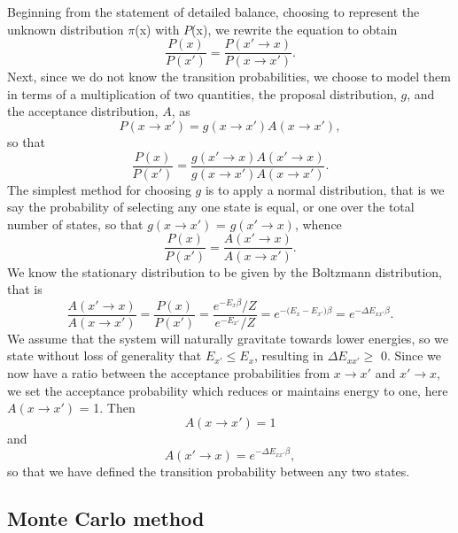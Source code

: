 \documentclass[11pt,a4paper]{article}
\begin{document}
Beginning from the statement of detailed balance, choosing to represent the unknown distribution $\pi$(x) with $P$(x), we rewrite the equation to obtain
\begin{equation}
\frac{P(x)}{P(x')} = \frac{P(x' \rightarrow x)}{P(x \rightarrow x')}.
\end{equation}
Next, since we do not know the transition probabilities, we choose to model them in terms of a multiplication of two quantities, the proposal distribution, $g$, and the acceptance distribution, $A$, as
\begin{equation}
P(x \rightarrow x') = g(x \rightarrow x')A(x \rightarrow x'),
\end{equation}
so that
\begin{equation}
\frac{P(x)}{P(x')} = \frac{g(x' \rightarrow x)A(x' \rightarrow x)}{g(x \rightarrow x')A(x \rightarrow x')}.
\end{equation}
The simplest method for choosing $g$ is to apply a normal distribution, that is we say the probability of selecting any one state is equal, or one over the total number of states, so that $g(x \rightarrow x')$ = $g(x' \rightarrow x)$, whence
\begin{equation}
\frac{P(x)}{P(x')} = \frac{A(x' \rightarrow x)}{A(x \rightarrow x')}.
\end{equation}
We know the stationary distribution to be given by the Boltzmann distribution, that is 
\begin{equation}
\frac{A(x' \rightarrow x)}{A(x \rightarrow x')} = \frac{P(x)}{P(x')} = \frac{e^{-E_x\beta}/Z}{e^{-E_{x'}}/Z} = e^{-\big(E_x - E_{x'}\big)\beta} = e^{-\Delta E_{xx'}\beta}.
\end{equation}
We assume that the system will naturally gravitate towards lower energies, so we state without loss of generality that $E_{x'} \leq E_x$, resulting in $\Delta E_{xx'} \geq$ 0. Since we now have a ratio between the acceptance probabilities from $x \rightarrow x'$ and $x' \rightarrow x$, we set the acceptance probability which reduces or maintains energy to one, here $A(x \rightarrow x')$ = 1. Then
\begin{equation}
A(x \rightarrow x') = 1
\end{equation}
and
\begin{equation}
A(x' \rightarrow x) = e^{-\Delta E_{xx'}\beta},
\end{equation}
so that we have defined the transition probability between any two states. 

\subsection{Monte Carlo method}
\end{document}
